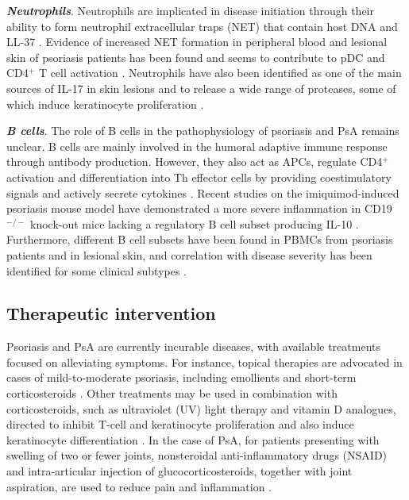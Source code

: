 \textbf{\textit{Neutrophils}}. Neutrophils are implicated in disease initiation through their ability to form neutrophil extracellular traps (NET) that contain host DNA and LL-37 \parencite{Hu2016}. Evidence of increased NET formation in peripheral blood and lesional skin of psoriasis patients has been found and seems to contribute to pDC and CD4$^+$ T cell activation \parencite{Hu2016}. Neutrophils have also been identified as one of the main sources of IL-17  in skin lesions and to release a wide range of proteases, some of which induce keratinocyte proliferation \parencite{Lin2011,Mahil2016}.


%
%

\textbf{\textit{B cells}}. The role of B cells in the pathophysiology of psoriasis and PsA remains unclear. B cells are mainly involved in the humoral adaptive immune response through antibody production. However, they also act as APCs, regulate CD4$^+$ activation and differentiation into Th effector cells by providing coestimulatory signals and actively secrete cytokines \parencite{Bouaziz2007,Constant1995,Harris2000,Linton2003}. Recent studies on the imiquimod-induced psoriasis mouse model have demonstrated a more severe inflammation in CD19$^{-/-}$ knock-out mice lacking a regulatory B cell subset producing IL-10 \parencite{Yanaba2013,Alrefai2016}. Furthermore, different B cell subsets have been found in PBMCs from psoriasis patients and in lesional skin, and correlation with disease severity has been identified for some clinical subtypes \parencite{Lu2016}.





\subsection{Therapeutic intervention}
Psoriasis and PsA are currently incurable diseases, with available treatments focused on alleviating symptoms. For instance, topical therapies are advocated in cases of mild-to-moderate psoriasis, including emollients and short-term corticosteroids \parencite{Menter2009}. Other treatments may be used in combination with corticosteroids, such as ultraviolet (UV) light therapy and vitamin D analogues, directed to inhibit T-cell and keratinocyte proliferation and also induce keratinocyte differentiation \parencite{Rizova2001}. In the case of PsA, for patients presenting with swelling of two or fewer joints, nonsteroidal anti-inflammatory drugs (NSAID) and intra-articular injection of glucocorticosteroids, together with joint aspiration, are used to reduce pain and inflammation \parencite{Coates2016}. 

